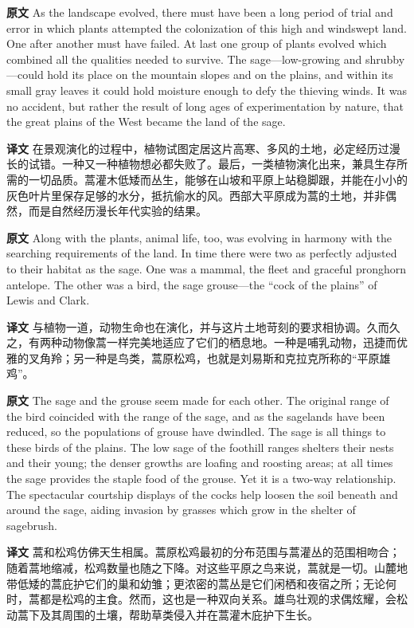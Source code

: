 \documentclass[UTF8,zihao=-4]{ctexart}
\begin{document}
\noindent\textbf{原文} As the landscape evolved, there must have been a long period of trial and error in which plants attempted the colonization of this high and windswept land. One after another must have failed. At last one group of plants evolved which combined all the qualities needed to survive. The sage---low-growing and shrubby---could hold its place on the mountain slopes and on the plains, and within its small gray leaves it could hold moisture enough to defy the thieving winds. It was no accident, but rather the result of long ages of experimentation by nature, that the great plains of the West became the land of the sage.
\par
\noindent\textbf{译文} 在景观演化的过程中，植物试图定居这片高寒、多风的土地，必定经历过漫长的试错。一种又一种植物想必都失败了。最后，一类植物演化出来，兼具生存所需的一切品质。蒿灌木低矮而丛生，能够在山坡和平原上站稳脚跟，并能在小小的灰色叶片里保存足够的水分，抵抗偷水的风。西部大平原成为蒿的土地，并非偶然，而是自然经历漫长年代实验的结果。
\par\medskip

\noindent\textbf{原文} Along with the plants, animal life, too, was evolving in harmony with the searching requirements of the land. In time there were two as perfectly adjusted to their habitat as the sage. One was a mammal, the fleet and graceful pronghorn antelope. The other was a bird, the sage grouse---the ``cock of the plains'' of Lewis and Clark.
\par
\noindent\textbf{译文} 与植物一道，动物生命也在演化，并与这片土地苛刻的要求相协调。久而久之，有两种动物像蒿一样完美地适应了它们的栖息地。一种是哺乳动物，迅捷而优雅的叉角羚；另一种是鸟类，蒿原松鸡，也就是刘易斯和克拉克所称的“平原雄鸡”。
\par\medskip

\noindent\textbf{原文} The sage and the grouse seem made for each other. The original range of the bird coincided with the range of the sage, and as the sagelands have been reduced, so the populations of grouse have dwindled. The sage is all things to these birds of the plains. The low sage of the foothill ranges shelters their nests and their young; the denser growths are loafing and roosting areas; at all times the sage provides the staple food of the grouse. Yet it is a two-way relationship. The spectacular courtship displays of the cocks help loosen the soil beneath and around the sage, aiding invasion by grasses which grow in the shelter of sagebrush.
\par
\noindent\textbf{译文} 蒿和松鸡仿佛天生相属。蒿原松鸡最初的分布范围与蒿灌丛的范围相吻合；随着蒿地缩减，松鸡数量也随之下降。对这些平原之鸟来说，蒿就是一切。山麓地带低矮的蒿庇护它们的巢和幼雏；更浓密的蒿丛是它们闲栖和夜宿之所；无论何时，蒿都是松鸡的主食。然而，这也是一种双向关系。雄鸟壮观的求偶炫耀，会松动蒿下及其周围的土壤，帮助草类侵入并在蒿灌木庇护下生长。
\par\medskip
\end{document}

